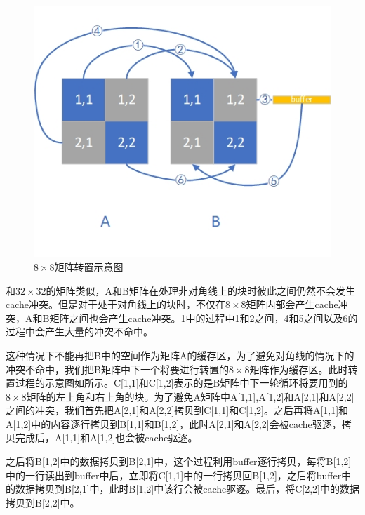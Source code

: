 \documentclass[supercite]{Experimental_Report}
\theoremstyle{definition}
\begin{document}
\begin{figure}[htb]
	\begin{center}
		\includegraphics[scale=1]{./images/lab2_5.jpg}
		\caption{$8\times8$矩阵转置示意图}
		\label{fig2-5}
	\end{center}
\end{figure}

和$32\times32$的矩阵类似，A和B矩阵在处理非对角线上的块时彼此之间仍然不会发生cache冲突。但是对于处于对角线上的块时，不仅在$8\times8$矩阵内部会产生cache冲突，A和B矩阵之间也会产生cache冲突。\ref{fig2-5}中的过程中1和2之间，4和5之间以及6的过程中会产生大量的冲突不命中。

这种情况下不能再把B中的空间作为矩阵A的缓存区，为了避免对角线的情况下的冲突不命中，我们把B矩阵中下一个将要进行转置的$8\times8$矩阵作为缓存区\cite{ref1}。此时转置过程的示意图如所示。C[1,1]和C[1,2]表示的是B矩阵中下一轮循环将要用到的$8\times8$矩阵的左上角和右上角的块。为了避免A矩阵中A[1,1],A[1,2]和A[2,1]和A[2,2]之间的冲突，我们首先把A[2,1]和A[2,2]拷贝到C[1,1]和C[1,2]。之后再将A[1,1]和A[1,2]中的内容逐行拷贝到B[1,1]和B[1,2]，此时A[2,1]和A[2,2]会被cache驱逐，拷贝完成后，A[1,1]和A[1,2]也会被cache驱逐。

之后将B[1,2]中的数据拷贝到B[2,1]中，这个过程利用buffer逐行拷贝，每将B[1,2]中的一行读出到buffer中后，立即将C[1,1]中的一行拷贝回B[1,2]，之后将buffer中的数据拷贝到B[2,1]中，此时B[1,2]中该行会被cache驱逐。最后，将C[2,2]中的数据拷贝到B[2,2]中。
\end{document}
